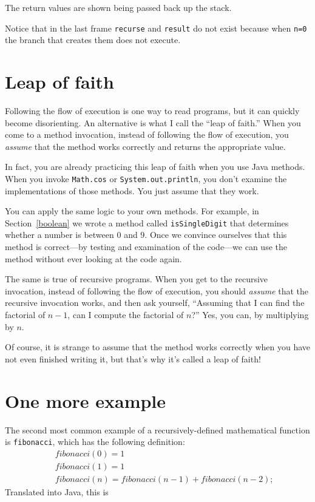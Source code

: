 The return values are shown being passed back up the stack.

Notice that in the last frame {\tt recurse} and {\tt result} do not
exist because when {\tt n=0} the branch that creates them does not
execute.


\section{Leap of faith}
\label{leap of faith}

Following the flow of execution is one way to read programs, but it can
quickly become disorienting.  An alternative is what I call the ``leap
of faith.''  When you come to a method invocation, instead of
following the flow of execution, you {\em assume} that the method
works correctly and returns the appropriate value.

In fact, you are already practicing this leap of faith
when you use Java methods.  When you invoke {\tt Math.cos}
or {\tt System.out.println}, you don't examine the implementations of
those methods.  You just assume that they work.

You can apply the same logic to your own methods.
For example, in Section~\ref{boolean} we wrote a method called
{\tt isSingleDigit} that determines whether a number is between
0 and 9.  Once we convince ourselves that this method
is correct---by testing and examination of the code---we can
use the method without ever looking at the code again.

The same is true of recursive programs.  When you get to
the recursive invocation, instead of following the flow of
execution, you should {\em assume} that the recursive invocation
works, and then ask yourself,
``Assuming that I can find the factorial of $n-1$, can I
compute the factorial of $n$?''  Yes, you can, by multiplying by $n$.

Of course, it is strange to assume that the method
works correctly when you have not even finished writing it,
but that's why it's called a leap of faith!


\section{One more example}
\label{fibonacci}

The second most common example of a recursively-defined
mathematical function is {\tt fibonacci}, which has the
following definition:
%
\begin{eqnarray*}
&& fibonacci(0) = 1 \\
&& fibonacci(1) = 1 \\
&& fibonacci(n) = fibonacci(n-1) + fibonacci(n-2);
\end{eqnarray*}
%
Translated into Java, this is

